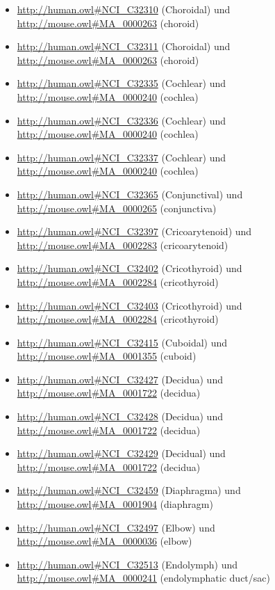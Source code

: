 \begin{itemize}
	\item \url{http://human.owl#NCI_C32310} (Choroidal\textunderscoreArtery) und \url{http://mouse.owl#MA_0000263} (choroid)
	\item \url{http://human.owl#NCI_C32311} (Choroidal\textunderscoreFissure) und \url{http://mouse.owl#MA_0000263} (choroid)
	\item \url{http://human.owl#NCI_C32335} (Cochlear\textunderscoreDuct) und \url{http://mouse.owl#MA_0000240} (cochlea)
	\item \url{http://human.owl#NCI_C32336} (Cochlear\textunderscoreLabyrinth) und \url{http://mouse.owl#MA_0000240} (cochlea)
	\item \url{http://human.owl#NCI_C32337} (Cochlear\textunderscoreNucleus) und \url{http://mouse.owl#MA_0000240} (cochlea)
	\item \url{http://human.owl#NCI_C32365} (Conjunctival\textunderscoreEpithelium) und \url{http://mouse.owl#MA_0000265} (conjunctiva)
	\item \url{http://human.owl#NCI_C32397} (Cricoarytenoid\textunderscoreJoint) und \url{http://mouse.owl#MA_0002283} (cricoarytenoid)
	\item \url{http://human.owl#NCI_C32402} (Cricothyroid\textunderscoreJoint) und \url{http://mouse.owl#MA_0002284} (cricothyroid)
	\item \url{http://human.owl#NCI_C32403} (Cricothyroid\textunderscoreLigament) und \url{http://mouse.owl#MA_0002284} (cricothyroid)
	\item \url{http://human.owl#NCI_C32415} (Cuboidal\textunderscoreEpithelium) und \url{http://mouse.owl#MA_0001355} (cuboid)
	\item \url{http://human.owl#NCI_C32427} (Decidua\textunderscoreCapsularis) und \url{http://mouse.owl#MA_0001722} (decidua)
	\item \url{http://human.owl#NCI_C32428} (Decidua\textunderscoreParietalis) und \url{http://mouse.owl#MA_0001722} (decidua)
	\item \url{http://human.owl#NCI_C32429} (Decidual\textunderscoreCell) und \url{http://mouse.owl#MA_0001722} (decidua)
	\item \url{http://human.owl#NCI_C32459} (Diaphragma\textunderscoreSellae) und \url{http://mouse.owl#MA_0001904} (diaphragm)
	\item \url{http://human.owl#NCI_C32497} (Elbow\textunderscoreJoint) und \url{http://mouse.owl#MA_0000036} (elbow)
	\item \url{http://human.owl#NCI_C32513} (Endolymph) und \url{http://mouse.owl#MA_0000241} (endolymphatic duct/sac)

\end{itemize}

